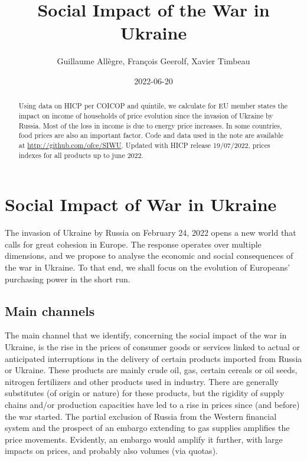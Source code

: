 \documentclass[
  9pt,
  a4paper,
  numbers=noendperiod,
  DIV=12]{scrartcl}
\title{Social Impact of the War in Ukraine}
\author{Guillaume Allègre, François Geerolf, Xavier Timbeau}
\date{2022-06-20}
\renewcommand*\contentsname{Table of contents}
\newcommand\contentsname{Table of contents}
\begin{document}
\maketitle
\begin{abstract}
Using data on HICP per COICOP and quintile, we calculate for EU member
states the impact on income of households of price evolution since the
invasion of Ukraine by Russia. Most of the loss in income is due to
energy price increases. In some countries, food prices are also an
important factor. Code and data used in the note are available at
\url{http://github.com/ofce/SIWU}. Updated with HICP release 19/07/2022,
prices indexes for all products up to june 2022.
\end{abstract}
\ifdefined\Shaded\renewenvironment{Shaded}{\begin{tcolorbox}[breakable, frame hidden, boxrule=0pt, borderline west={3pt}{0pt}{shadecolor}, enhanced, sharp corners, interior hidden]}{\end{tcolorbox}}\fi

\renewcommand*\contentsname{Table of contents}
{
\hypersetup{linkcolor=}
\setcounter{tocdepth}{1}
\tableofcontents
}
\hypertarget{social-impact-of-war-in-ukraine}{%
\section{Social Impact of War in
Ukraine}\label{social-impact-of-war-in-ukraine}}

The invasion of Ukraine by Russia on February 24, 2022 opens a new world
that calls for great cohesion in Europe. The response operates over
multiple dimensions, and we propose to analyse the economic and social
consequences of the war in Ukraine. To that end, we shall focus on the
evolution of Europeans' purchasing power in the short run.

\hypertarget{main-channels}{%
\subsection{Main channels}\label{main-channels}}

The main channel that we identify, concerning the social impact of the
war in Ukraine, is the rise in the prices of consumer goods or services
linked to actual or anticipated interruptions in the delivery of certain
products imported from Russia or Ukraine. These products are mainly
crude oil, gas, certain cereals or oil seeds, nitrogen fertilizers and
other products used in industry. There are generally substitutes (of
origin or nature) for these products, but the rigidity of supply chains
and/or production capacities have led to a rise in prices since (and
before) the war started. The partial exclusion of Russia from the
Western financial system and the prospect of an embargo extending to gas
supplies amplifies the price movements. Evidently, an embargo would
amplify it further, with large impacts on prices, and probably also
volumes (via quotas).
\end{document}

